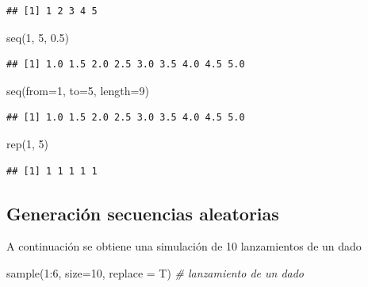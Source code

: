\documentclass[
]{book}
\newenvironment{Shaded}{\begin{snugshade}}{\end{snugshade}}
\newcommand{\AttributeTok}[1]{\textcolor[rgb]{0.77,0.63,0.00}{#1}}
\newcommand{\CommentTok}[1]{\textcolor[rgb]{0.56,0.35,0.01}{\textit{#1}}}
\newcommand{\DecValTok}[1]{\textcolor[rgb]{0.00,0.00,0.81}{#1}}
\newcommand{\FloatTok}[1]{\textcolor[rgb]{0.00,0.00,0.81}{#1}}
\newcommand{\FunctionTok}[1]{\textcolor[rgb]{0.00,0.00,0.00}{#1}}
\newcommand{\NormalTok}[1]{#1}
\newcommand{\SpecialCharTok}[1]{\textcolor[rgb]{0.00,0.00,0.00}{#1}}
\theoremstyle{break}
\theoremstyle{nonumberplain}
\begin{document}
\begin{verbatim}
## [1] 1 2 3 4 5
\end{verbatim}

\begin{Shaded}
\begin{Highlighting}[]
\FunctionTok{seq}\NormalTok{(}\DecValTok{1}\NormalTok{, }\DecValTok{5}\NormalTok{, }\FloatTok{0.5}\NormalTok{)}
\end{Highlighting}
\end{Shaded}

\begin{verbatim}
## [1] 1.0 1.5 2.0 2.5 3.0 3.5 4.0 4.5 5.0
\end{verbatim}

\begin{Shaded}
\begin{Highlighting}[]
\FunctionTok{seq}\NormalTok{(}\AttributeTok{from=}\DecValTok{1}\NormalTok{, }\AttributeTok{to=}\DecValTok{5}\NormalTok{, }\AttributeTok{length=}\DecValTok{9}\NormalTok{)}
\end{Highlighting}
\end{Shaded}

\begin{verbatim}
## [1] 1.0 1.5 2.0 2.5 3.0 3.5 4.0 4.5 5.0
\end{verbatim}

\begin{Shaded}
\begin{Highlighting}[]
\FunctionTok{rep}\NormalTok{(}\DecValTok{1}\NormalTok{, }\DecValTok{5}\NormalTok{)}
\end{Highlighting}
\end{Shaded}

\begin{verbatim}
## [1] 1 1 1 1 1
\end{verbatim}

\hypertarget{generaciuxf3n-secuencias-aleatorias}{%
\subsection{Generación secuencias aleatorias}\label{generaciuxf3n-secuencias-aleatorias}}

A continuación se obtiene una simulación de 10 lanzamientos de un dado

\begin{Shaded}
\begin{Highlighting}[]
\FunctionTok{sample}\NormalTok{(}\DecValTok{1}\SpecialCharTok{:}\DecValTok{6}\NormalTok{, }\AttributeTok{size=}\DecValTok{10}\NormalTok{, }\AttributeTok{replace =}\NormalTok{ T) }\CommentTok{\# lanzamiento de un dado}
\end{Highlighting}
\end{Shaded}
\end{document}
